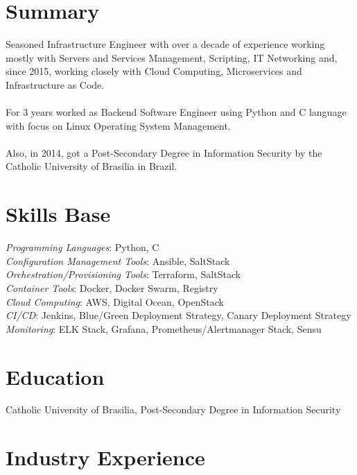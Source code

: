 \documentclass[margin]{res}
\begin{document}

\address{Winnipeg, MB, Canada \\
  \href{mailto:brunocriado@gmail.com}{brunocriado@gmail.com} \\ Phone: +1 431 588 3334}


\begin{resume}

  \section{Summary} Seasoned Infrastructure Engineer with over a decade of experience working mostly with Servers and Services
  Management, Scripting, IT Networking and, since 2015, working closely with Cloud Computing, Microservices and Infrastructure as Code.\\ \\
  For 3 years worked as Backend Software Engineer using Python and C language with focus on Linux Operating System Management.\\ \\
  Also, in 2014, got a Post-Secondary Degree in Information Security by the Catholic University of Brasilia in Brazil.

  \section{Skills Base}
  \textit{Programming Languages}: Python, C\\
  \textit{Configuration Management Tools}: Ansible, SaltStack\\
  \textit{Orchestration/Provisioning Tools}: Terraform, SaltStack\\
  \textit{Container Tools}: Docker, Docker Swarm, Registry\\
  \textit{Cloud Computing}: AWS, Digital Ocean, OpenStack\\
  \textit{CI/CD}: Jenkins, Blue/Green Deployment Strategy, Canary Deployment Strategy\\
  \textit{Monitoring}: ELK Stack, Grafana, Prometheus/Alertmanager Stack, Sensu\\

  \section{Education} Catholic University of Brasilia, Post-Secondary Degree in Information
  Security

  \section{Industry Experience}


\end{resume}
\end{document}
